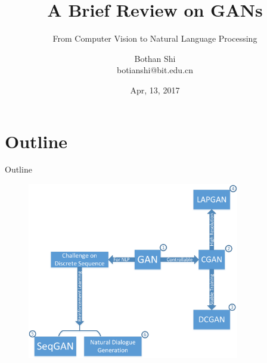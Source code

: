 \documentclass[10pt]{beamer}
\begin{document}
	
	\title{A Brief Review on GANs}
	\subtitle{From Computer Vision to Natural Language Processing}
	\author{Bothan Shi \\ botianshi@bit.edu.cn}
	\date{Apr, 13, 2017}
	
	
	\begin{frame}[plain]
		\titlepage
	\end{frame}

	\part{Outline}
	\begin{frame}{Outline}
		\begin{figure}
			\includegraphics[width=25em]{figures/outline.png}
		\end{figure}
	\end{frame}
\end{document}
